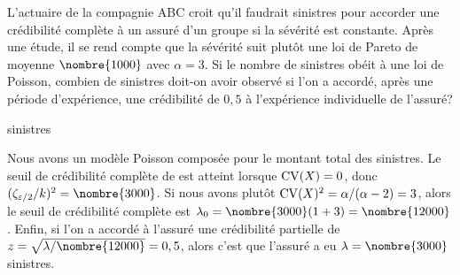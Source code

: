 \begin{exercice}
  L'actuaire de la compagnie ABC croit qu'il faudrait 
  sinistres pour accorder une crédibilité complète à un assuré d'un
  groupe si la sévérité est constante.  Après une étude, il se rend
  compte que la sévérité suit plutôt une loi de Pareto de moyenne
  $\nombre{1000}$ avec $\alpha = 3$. Si le nombre de sinistres obéit à
  une loi de Poisson, combien de sinistres doit-on avoir observé si
  l'on a accordé, après une période d'expérience, une crédibilité de
  $0,5$ à l'expérience individuelle de l'assuré?
  \begin{rep}
     sinistres
  \end{rep}
  \begin{sol}
    Nous avons un modèle Poisson composée pour le montant total des
    sinistres. Le seuil de crédibilité complète de  est
    atteint lorsque $\operatorname{CV}(X) = 0$, donc
    $(\zeta_{\varepsilon/2}/k)^2 = \nombre{3000}$. Si nous avons plutôt
    $\operatorname{CV}(X)^2 = \alpha/(\alpha - 2) = 3$, alors le seuil de
    crédibilité complète est $\lambda_0 = \nombre{3000}(1 + 3) =
    \nombre{12000}$. Enfin, si l'on a accordé à l'assuré une
    crédibilité partielle de $z = \sqrt{\lambda/\nombre{12000}} = 0,5$,
    alors c'est que l'assuré a eu $\lambda = \nombre{3000}$
    sinistres.
  \end{sol}
\end{exercice}

